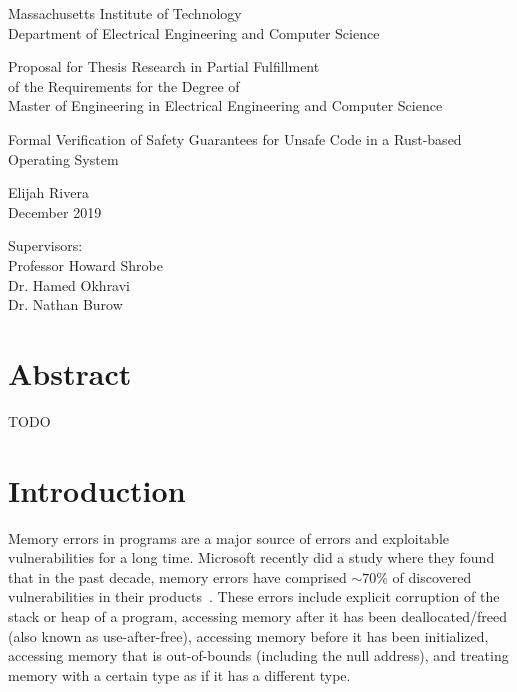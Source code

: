 \documentclass[12pt]{article}
\begin{document}
\begin{titlepage}
   \begin{center}
       \vspace*{1cm}
       Massachusetts Institute of Technology \\
       Department of Electrical Engineering and Computer Science
 
       \vspace{1cm}
       Proposal for Thesis Research in Partial Fulfillment \\
       of the Requirements for the Degree of \\
       Master of Engineering in Electrical Engineering and Computer Science
 
       \vspace{1cm}
 
       Formal Verification of Safety Guarantees for Unsafe Code in a Rust-based Operating System
 
       \vspace{1cm}
       Elijah Rivera \\
       December 2019
 
       \vspace{1cm}
        Supervisors: \\ Professor Howard Shrobe \\
        Dr. Hamed Okhravi \\
        Dr. Nathan Burow
   \end{center}
\end{titlepage}

\section*{Abstract}
TODO

\section{Introduction}

Memory errors in programs are a major source of errors and exploitable vulnerabilities for a long time. Microsoft recently did a study where they found that in the past decade, memory errors have comprised $\sim70\%$ of discovered vulnerabilities in their products~\cite{miller2019trends}. These errors include explicit corruption of the stack or heap of a program, accessing memory after it has been deallocated/freed (also known as use-after-free), accessing memory before it has been initialized, accessing memory that is out-of-bounds (including the null address), and treating memory with a certain type as if it has a different type.
\end{document}
